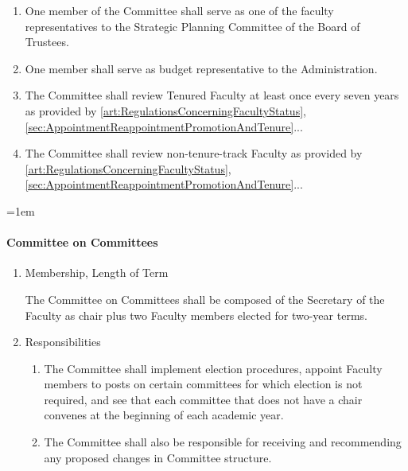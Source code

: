 \documentclass{manual}
\let\oldparagraph\paragraph
\renewcommand\paragraph{\leftskip=1em\oldparagraph}
\newcommand{\itemLevelA}{\alph*.}
\newcommand{\itemLevelB}{\arabic*)}
\newcommand{\itemRefA}{\alph*}
\newcommand{\itemRefB}{\arabic*}
\begin{document}
\begin{enumerate}[label=\itemLevelA,ref=\itemRefA]
\begin{enumerate}[label=\itemLevelB,ref=\itemRefB]
\item One member of the Committee shall serve as one of the faculty representatives to the Strategic Planning Committee of the Board of Trustees.
\item One member shall serve as budget representative to the Administration.
\item The Committee shall review Tenured Faculty at least once every seven years as provided by \cref{art:RegulationsConcerningFacultyStatus}, \cref{sec:AppointmentReappointmentPromotionAndTenure}...
\item The Committee shall review non-tenure-track Faculty as provided by \cref{art:RegulationsConcerningFacultyStatus}, \cref{sec:AppointmentReappointmentPromotionAndTenure}...

\end{enumerate}
\end{enumerate}

\paragraph{Committee on Committees}

\begin{enumerate}[label=\itemLevelA,ref=\itemRefA]
\item Membership, Length of Term

The Committee on Committees shall be composed of the Secretary of the Faculty as chair plus two Faculty members elected for two-year terms.
\item Responsibilities
\begin{enumerate}[label=\itemLevelB,ref=\itemRefB]
\item The Committee shall implement election procedures, appoint Faculty members to posts on certain committees for which election is not required, and see that each committee that does not have a chair convenes at the beginning of each academic year.
\item The Committee shall also be responsible for receiving and recommending any proposed changes in Committee structure.

\end{enumerate}
\end{enumerate}
\end{document}
